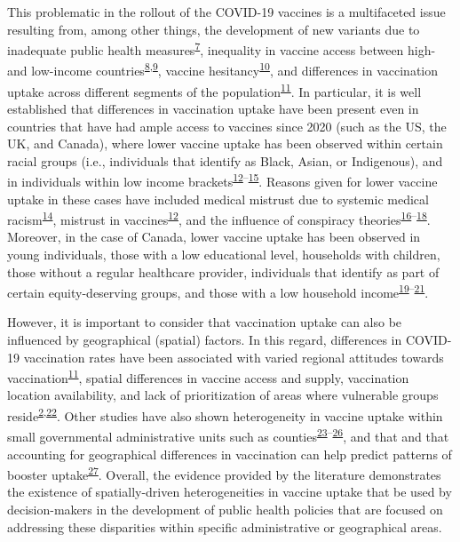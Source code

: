 \documentclass[
  letterpaper,
  DIV=11,
  numbers=noendperiod]{scrartcl}
\begin{document}
This problematic in the rollout of the COVID-19 vaccines is a
multifaceted issue resulting from, among other things, the development
of new variants due to inadequate public health
measures\textsuperscript{\protect\hyperlink{ref-li2021}{7}}, inequality
in vaccine access between high- and low-income
countries\textsuperscript{\protect\hyperlink{ref-gerretsen2021}{8},\protect\hyperlink{ref-tamey2022}{9}},
vaccine
hesitancy\textsuperscript{\protect\hyperlink{ref-nafilyan2021}{10}}, and
differences in vaccination uptake across different segments of the
population\textsuperscript{\protect\hyperlink{ref-malik2020}{11}}. In
particular, it is well established that differences in vaccination
uptake have been present even in countries that have had ample access to
vaccines since 2020 (such as the US, the UK, and Canada), where lower
vaccine uptake has been observed within certain racial groups (i.e.,
individuals that identify as Black, Asian, or Indigenous), and in
individuals within low income
brackets\textsuperscript{\protect\hyperlink{ref-willis2021}{12}--\protect\hyperlink{ref-khubchandani2021}{15}}.
Reasons given for lower vaccine uptake in these cases have included
medical mistrust due to systemic medical
racism\textsuperscript{\protect\hyperlink{ref-stoler2021}{14}}, mistrust
in vaccines\textsuperscript{\protect\hyperlink{ref-willis2021}{12}}, and
the influence of conspiracy
theories\textsuperscript{\protect\hyperlink{ref-bogart2021}{16}--\protect\hyperlink{ref-freeman2020}{18}}.
Moreover, in the case of Canada, lower vaccine uptake has been observed
in young individuals, those with a low educational level, households
with children, those without a regular healthcare provider, individuals
that identify as part of certain equity-deserving groups, and those with
a low household
income\textsuperscript{\protect\hyperlink{ref-guay2022}{19}--\protect\hyperlink{ref-hussain2022}{21}}.

However, it is important to consider that vaccination uptake can also be
influenced by geographical (spatial) factors. In this regard,
differences in COVID-19 vaccination rates have been associated with
varied regional attitudes towards
vaccination\textsuperscript{\protect\hyperlink{ref-malik2020}{11}},
spatial differences in vaccine access and supply, vaccination location
availability, and lack of prioritization of areas where vulnerable
groups
reside\textsuperscript{\protect\hyperlink{ref-bogoch2022}{2},\protect\hyperlink{ref-nguyen2021}{22}}.
Other studies have also shown heterogeneity in vaccine uptake within
small governmental administrative units such as
counties\textsuperscript{\protect\hyperlink{ref-mollalo2021}{23}--\protect\hyperlink{ref-bhuiyan2022}{26}},
and that and that accounting for geographical differences in vaccination
can help predict patterns of booster
uptake\textsuperscript{\protect\hyperlink{ref-wood2022}{27}}. Overall,
the evidence provided by the literature demonstrates the existence of
spatially-driven heterogeneities in vaccine uptake that be used by
decision-makers in the development of public health policies that are
focused on addressing these disparities within specific administrative
or geographical areas.
\end{document}
